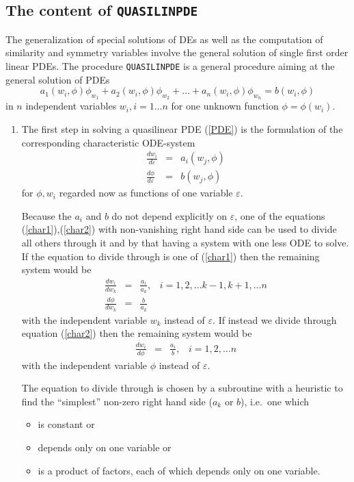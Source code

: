 \documentclass[12pt]{article}
\begin{document}
\subsection{The content of {\tt QUASILINPDE}}
The generalization of special solutions of DEs as well as the computation of
similarity and symmetry variables involve the general solution of single
first order linear PDEs.
The procedure {\tt QUASILINPDE} is a general procedure
aiming at the general solution of
PDEs
\begin{equation}
   a_1(w_i,\phi)\phi_{w_1} + a_2(w_i,\phi)\phi_{w_2} + \ldots +
   a_n(w_i,\phi)\phi_{w_n} = b(w_i,\phi) \label{PDE}
\end{equation}
in $n$ independent variables $w_i, i=1\ldots n$ for one unknown function
$\phi=\phi(w_i)$.
\begin{enumerate}
\item
The first step in solving a quasilinear PDE (\ref{PDE})
is the formulation of the corresponding characteristic ODE-system
\begin{eqnarray}
\frac{dw_i}{d\varepsilon} & = & a_i(w_j,\phi) \label{char1}   \\
\frac{d\phi}{d\varepsilon} & = & b(w_j,\phi)  \label{char2}
\end{eqnarray}
for $\phi, w_i$ regarded now as functions of one variable $\varepsilon$.

Because the $a_i$ and $b$ do not depend explicitly on $\varepsilon$, one of the
equations (\ref{char1}),(\ref{char2}) with non-vanishing right hand side
can be used to divide all others through it and by that having a system
with one less ODE to solve. 
If the equation to divide through is one of
(\ref{char1}) then the remaining system would be
\begin{eqnarray}
\frac{dw_i}{dw_k} & = & \frac{a_i}{a_k} , \;\;\;i=1,2,\ldots k-1,k+1,\ldots n
  \label{char3} \\
\frac{d\phi}{dw_k} & = & \frac{b}{a_k}  \label{char4}
\end{eqnarray}
with the independent variable $w_k$ instead of $\varepsilon$.
If instead we divide through equation
(\ref{char2}) then the remaining system would be
\begin{eqnarray}
\frac{dw_i}{d\phi} & = & \frac{a_i}{b} , \;\;\;i=1,2,\ldots n
  \label{char3a}
\end{eqnarray}
with the independent variable $\phi$ instead of $\varepsilon$.

The equation to divide through is chosen by a
subroutine with a heuristic to find the ``simplest'' non-zero
right hand side ($a_k$ or $b$), i.e.\ one which
\begin{itemize}
\item is constant or
\item depends only on one variable or
\item is a product of factors, each of which depends only on
one variable.
\end{itemize}


\end{enumerate}
\end{document}
